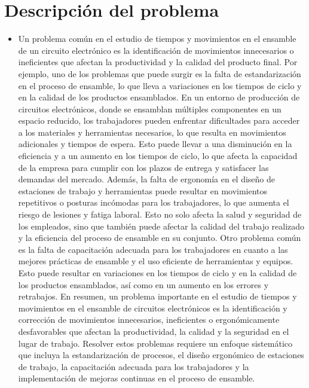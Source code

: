 \section{Descripción del problema}
\begin{itemize}
    \item Un problema común en el estudio de tiempos y movimientos en el ensamble de un circuito electrónico es la identificación de movimientos innecesarios o ineficientes que afectan la productividad y la calidad del producto final. Por ejemplo, uno de los problemas que puede surgir es la falta de estandarización en el proceso de ensamble, lo que lleva a variaciones en los tiempos de ciclo y en la calidad de los productos ensamblados.
En un entorno de producción de circuitos electrónicos, donde se ensamblan múltiples componentes en un espacio reducido, los trabajadores pueden enfrentar dificultades para acceder a los materiales y herramientas necesarios, lo que resulta en movimientos adicionales y tiempos de espera. Esto puede llevar a una disminución en la eficiencia y a un aumento en los tiempos de ciclo, lo que afecta la capacidad de la empresa para cumplir con los plazos de entrega y satisfacer las demandas del mercado.
Además, la falta de ergonomía en el diseño de estaciones de trabajo y herramientas puede resultar en movimientos repetitivos o posturas incómodas para los trabajadores, lo que aumenta el riesgo de lesiones y fatiga laboral. Esto no solo afecta la salud y seguridad de los empleados, sino que también puede afectar la calidad del trabajo realizado y la eficiencia del proceso de ensamble en su conjunto.
Otro problema común es la falta de capacitación adecuada para los trabajadores en cuanto a las mejores prácticas de ensamble y el uso eficiente de herramientas y equipos. Esto puede resultar en variaciones en los tiempos de ciclo y en la calidad de los productos ensamblados, así como en un aumento en los errores y retrabajos.
En resumen, un problema importante en el estudio de tiempos y movimientos en el ensamble de circuitos electrónicos es la identificación y corrección de movimientos innecesarios, ineficientes o ergonómicamente desfavorables que afectan la productividad, la calidad y la seguridad en el lugar de trabajo. Resolver estos problemas requiere un enfoque sistemático que incluya la estandarización de procesos, el diseño ergonómico de estaciones de trabajo, la capacitación adecuada para los trabajadores y la implementación de mejoras continuas en el proceso de ensamble.
\end{itemize}

